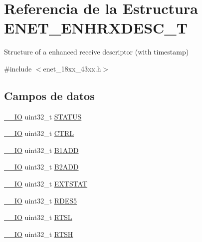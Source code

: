 \hypertarget{struct_e_n_e_t___e_n_h_r_x_d_e_s_c___t}{}\section{Referencia de la Estructura E\+N\+E\+T\+\_\+\+E\+N\+H\+R\+X\+D\+E\+S\+C\+\_\+T}
\label{struct_e_n_e_t___e_n_h_r_x_d_e_s_c___t}


Structure of a enhanced receive descriptor (with timestamp)  




{\ttfamily \#include $<$enet\+\_\+18xx\+\_\+43xx.\+h$>$}

\subsection*{Campos de datos}
\begin{DoxyCompactItemize}
\item 
\hyperlink{core__sc300_8h_aec43007d9998a0a0e01faede4133d6be}{\+\_\+\+\_\+\+IO} uint32\+\_\+t \hyperlink{struct_e_n_e_t___e_n_h_r_x_d_e_s_c___t_a0b3f4c41f87ca52c3b6bca0bafa0df6b}{S\+T\+A\+T\+US}
\item 
\hyperlink{core__sc300_8h_aec43007d9998a0a0e01faede4133d6be}{\+\_\+\+\_\+\+IO} uint32\+\_\+t \hyperlink{struct_e_n_e_t___e_n_h_r_x_d_e_s_c___t_a15fc8d35f045f329b80c544bef35ff64}{C\+T\+RL}
\item 
\hyperlink{core__sc300_8h_aec43007d9998a0a0e01faede4133d6be}{\+\_\+\+\_\+\+IO} uint32\+\_\+t \hyperlink{struct_e_n_e_t___e_n_h_r_x_d_e_s_c___t_a9b99a80d13d854bce5c3f9646964c34e}{B1\+A\+DD}
\item 
\hyperlink{core__sc300_8h_aec43007d9998a0a0e01faede4133d6be}{\+\_\+\+\_\+\+IO} uint32\+\_\+t \hyperlink{struct_e_n_e_t___e_n_h_r_x_d_e_s_c___t_a3cf5d995cea5c3b42b9224871c5b18a1}{B2\+A\+DD}
\item 
\hyperlink{core__sc300_8h_aec43007d9998a0a0e01faede4133d6be}{\+\_\+\+\_\+\+IO} uint32\+\_\+t \hyperlink{struct_e_n_e_t___e_n_h_r_x_d_e_s_c___t_a900e621c36e68c7d442239eab19112d8}{E\+X\+T\+S\+T\+AT}
\item 
\hyperlink{core__sc300_8h_aec43007d9998a0a0e01faede4133d6be}{\+\_\+\+\_\+\+IO} uint32\+\_\+t \hyperlink{struct_e_n_e_t___e_n_h_r_x_d_e_s_c___t_a1db082c340933c5dc8ac865eae4fac82}{R\+D\+E\+S5}
\item 
\hyperlink{core__sc300_8h_aec43007d9998a0a0e01faede4133d6be}{\+\_\+\+\_\+\+IO} uint32\+\_\+t \hyperlink{struct_e_n_e_t___e_n_h_r_x_d_e_s_c___t_a4cbcdf073b9160af8e58bfec107a74f6}{R\+T\+SL}
\item 
\hyperlink{core__sc300_8h_aec43007d9998a0a0e01faede4133d6be}{\+\_\+\+\_\+\+IO} uint32\+\_\+t \hyperlink{struct_e_n_e_t___e_n_h_r_x_d_e_s_c___t_a80c9620ace27791eb31d9708e5253892}{R\+T\+SH}
\end{DoxyCompactItemize}


